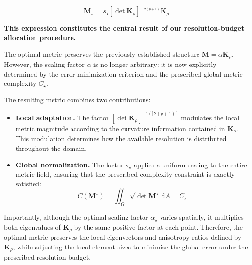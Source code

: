 \documentclass[11pt,a4paper]{article}
\begin{document}
\begin{equation}
    \label{eq:optimal_metric_tensor}
    \boxed{\boxed{
    \displaystyle
    \mathbf M_\star =
    s_\star
    \left[\det\mathbf K_\rho\right]^{
        -\frac{1}{2(p+1)}
    }
    \mathbf K_\rho
    }}
\end{equation}

\medskip

\noindent\textbf{This expression constitutes the central result
of our resolution-budget allocation procedure.}

\medskip

\noindent The optimal metric preserves the previously established
structure $\mathbf M=\alpha\mathbf K_\rho$. However, the
scaling factor $\alpha$ is no longer arbitrary: it is now
explicitly determined by the error minimization criterion
and the prescribed global metric complexity $C_\star$.

\medskip

\noindent The resulting metric combines two contributions:

\begin{itemize}

    \item \textbf{Local adaptation.}
    The factor
    $\left[\det\mathbf K_\rho\right]^{-1/[2(p+1)]}$
    modulates the local metric magnitude according to the
    curvature information contained in $\mathbf K_\rho$.
    This modulation determines how the available resolution
    is distributed throughout the domain.

    \item \textbf{Global normalization.}
    The factor $s_\star$ applies a uniform scaling to the
    entire metric field, ensuring that the prescribed
    complexity constraint is exactly satisfied:
    \begin{equation*}
        \label{eq:optimal_complexity_verification}
        C(\mathbf M^\star)
        =\iint_\Omega\sqrt{\det\mathbf M^\star}
        \,\mathrm{d}A
        =C_\star
    \end{equation*}

\end{itemize}

\noindent Importantly, although the optimal scaling factor
$\alpha_\star$ varies spatially, it multiplies both
eigenvalues of $\mathbf K_\rho$ by the same positive
factor at each point. Therefore, the optimal metric
preserves the local eigenvectors and anisotropy ratios
defined by $\mathbf K_\rho$, while adjusting the local
element sizes to minimize the global error under the
prescribed resolution budget.
\end{document}
